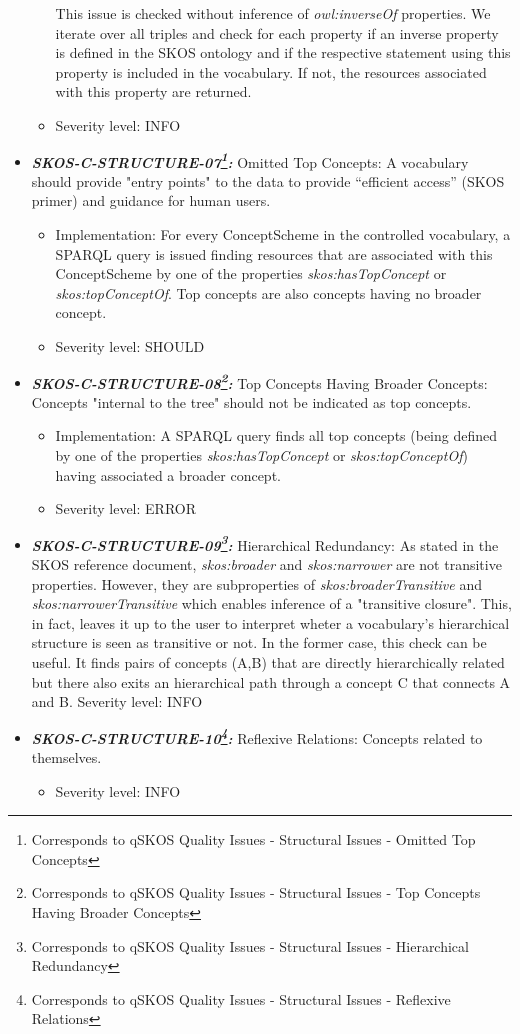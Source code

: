 \documentclass{llncs}
\begin{document}
\begin{itemize}
\begin{itemize}
		This issue is checked without inference of \emph{owl:inverseOf} properties. We iterate over all triples and check for each property if an inverse property is defined in the SKOS ontology and if the respective statement using this property is included in the vocabulary. If not, the resources associated with this property are returned. 
	  \item Severity level: INFO
\end{itemize}
	\item \textbf{{\em SKOS-C-STRUCTURE-07\footnote{Corresponds to qSKOS Quality Issues - Structural Issues - Omitted Top Concepts}:}}
	Omitted Top Concepts:
	A vocabulary should provide "entry points" to the data to provide “efficient access” (SKOS primer) and guidance for human users. 
	\begin{itemize}
		\item Implementation:
		For every ConceptScheme in the controlled vocabulary, a SPARQL query is issued finding resources that are associated with this ConceptScheme by one of the properties \emph{skos:hasTopConcept} or \emph{skos:topConceptOf}. Top concepts are also concepts having no broader concept. 
	  \item Severity level: SHOULD
\end{itemize}
	\item \textbf{{\em SKOS-C-STRUCTURE-08\footnote{Corresponds to qSKOS Quality Issues - Structural Issues - Top Concepts Having Broader Concepts}:}}
	Top Concepts Having Broader Concepts:
	Concepts "internal to the tree" should not be indicated as top concepts.
	\begin{itemize}
		\item Implementation:
		A SPARQL query finds all top concepts (being defined by one of the properties \emph{skos:hasTopConcept} or \emph{skos:topConceptOf}) having associated a broader concept. 
	  \item Severity level: ERROR
\end{itemize}
	\item \textbf{{\em SKOS-C-STRUCTURE-09\footnote{Corresponds to qSKOS Quality Issues - Structural Issues - Hierarchical Redundancy}:}}
	Hierarchical Redundancy:
	As stated in the SKOS reference document, \emph{skos:broader} and \emph{skos:narrower} are not transitive properties. However, they are subproperties of \emph{skos:broaderTransitive} and \emph{skos:narrowerTransitive} which enables inference of a "transitive closure". This, in fact, leaves it up to the user to interpret wheter a vocabulary's hierarchical structure is seen as transitive or not. In the former case, this check can be useful. It finds pairs of concepts (A,B) that are directly hierarchically related but there also exits an hierarchical path through a concept C that connects A and B. 
	Severity level: INFO
	\item \textbf{{\em SKOS-C-STRUCTURE-10\footnote{Corresponds to qSKOS Quality Issues - Structural Issues - Reflexive Relations}:}}
	Reflexive Relations:
	Concepts related to themselves. 
	\begin{itemize}
		\item Severity level: INFO
	\end{itemize}
\end{itemize}
\end{document}
